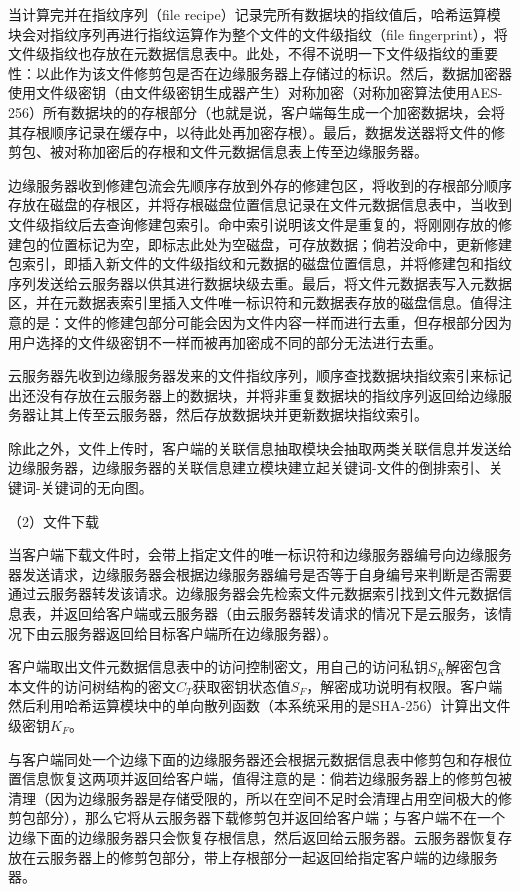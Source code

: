 \documentclass[promaster]{thesis-uestc}
\begin{document}
当计算完并在指纹序列（file recipe）记录完所有数据块的指纹值后，哈希运算模块会对指纹序列再进行指纹运算作为整个文件的文件级指纹（file fingerprint），将文件级指纹也存放在元数据信息表中。此处，不得不说明一下文件级指纹的重要性：以此作为该文件修剪包是否在边缘服务器上存储过的标识。然后，数据加密器使用文件级密钥（由文件级密钥生成器产生）对称加密（对称加密算法使用AES-256）所有数据块的的存根部分（也就是说，客户端每生成一个加密数据块，会将其存根顺序记录在缓存中，以待此处再加密存根）。最后，数据发送器将文件的修剪包、被对称加密后的存根和文件元数据信息表上传至边缘服务器。

边缘服务器收到修建包流会先顺序存放到外存的修建包区，将收到的存根部分顺序存放在磁盘的存根区，并将存根磁盘位置信息记录在文件元数据信息表中，当收到文件级指纹后去查询修建包索引。命中索引说明该文件是重复的，将刚刚存放的修建包的位置标记为空，即标志此处为空磁盘，可存放数据；倘若没命中，更新修建包索引，即插入新文件的文件级指纹和元数据的磁盘位置信息，并将修建包和指纹序列发送给云服务器以供其进行数据块级去重。最后，将文件元数据表写入元数据区，并在元数据表索引里插入文件唯一标识符和元数据表存放的磁盘信息。值得注意的是：文件的修建包部分可能会因为文件内容一样而进行去重，但存根部分因为用户选择的文件级密钥不一样而被再加密成不同的部分无法进行去重。

云服务器先收到边缘服务器发来的文件指纹序列，顺序查找数据块指纹索引来标记出还没有存放在云服务器上的数据块，并将非重复数据块的指纹序列返回给边缘服务器让其上传至云服务器，然后存放数据块并更新数据块指纹索引。

除此之外，文件上传时，客户端的关联信息抽取模块会抽取两类关联信息并发送给边缘服务器，边缘服务器的关联信息建立模块建立起关键词-文件的倒排索引、关键词-关键词的无向图。

（2）文件下载

当客户端下载文件时，会带上指定文件的唯一标识符和边缘服务器编号向边缘服务器发送请求，边缘服务器会根据边缘服务器编号是否等于自身编号来判断是否需要通过云服务器转发该请求。边缘服务器会先检索文件元数据索引找到文件元数据信息表，并返回给客户端或云服务器（由云服务器转发请求的情况下是云服务，该情况下由云服务器返回给目标客户端所在边缘服务器）。

客户端取出文件元数据信息表中的访问控制密文，用自己的访问私钥$S_K$解密包含本文件的访问树结构的密文$C_T$获取密钥状态值$S_F$，解密成功说明有权限。客户端然后利用哈希运算模块中的单向散列函数（本系统采用的是SHA-256）计算出文件级密钥$K_F$。

与客户端同处一个边缘下面的边缘服务器还会根据元数据信息表中修剪包和存根位置信息恢复这两项并返回给客户端，值得注意的是：倘若边缘服务器上的修剪包被清理（因为边缘服务器是存储受限的，所以在空间不足时会清理占用空间极大的修剪包部分），那么它将从云服务器下载修剪包并返回给客户端；与客户端不在一个边缘下面的边缘服务器只会恢复存根信息，然后返回给云服务器。云服务器恢复存放在云服务器上的修剪包部分，带上存根部分一起返回给指定客户端的边缘服务器。
\end{document}
